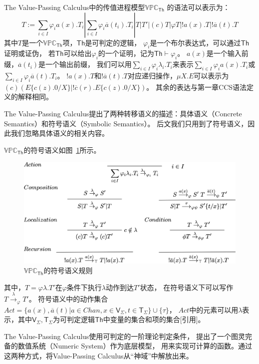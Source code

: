 The Value-Passing Calculus中的传值进程模型$\mathbb{VPC}_{\mathsf{Th}}$
的语法可以表示为：
$$T:=\sum_{i\in I}\varphi_i a(x).T_i|\sum_{i\in I}\varphi_i\overline{a}(t_i).T_i|T|T'|(c)T|\varphi T|!a(x).T|!\overline{a}(t).T$$
其中$T$是一个$\mathbb{VPC}_{\mathsf{Th}}$项，$\mathsf{Th}$是可判定的逻辑，
$\varphi_i$是一个布尔表达式，可以通过$\mathsf{Th}$证明或证伪，
若$\mathsf{Th}$可以给出$\varphi_i$的一个证明，记为$\mathsf{Th}\vdash \varphi_i$。
$a(x)$是一个输入前缀，$\overline{a}(t_i)$是一个输出前缀，
我们可以用$\sum_{i\in I}\varphi_i\lambda_i.T_i$来表示$\sum_{i\in I}\varphi_i a(x).T_i$或$\sum_{i\in I}\varphi_i \overline{a}(t).T_i$。
$!a(x).T$和$!\overline{a}(t).T$对应递归操作，$\mu X.E$可以表示为
$(c)(E\{c(z).0/X\}|!\overline{c}(r).E\{c(z).0/X\})$。
其余的表达与第一章CCS语法定义的解释相同。

The Value-Passing Calculus提出了两种转移语义的描述：具体语义（Concrete Semantics）和符号语义（Symbolic Semantics）。
后文我们只用到了符号语义，因此我们忽略具体语义的相关内容。

$\mathbb{VPC}_{\mathsf{Th}}$的符号语义如图~\ref{fig_vpc}所示。

\begin{figure}[!htbp]
   \small
   \centering
   \includegraphics[width=13cm]{../figure/vpc.png}
    \caption[]{$\mathbb{VPC}_{\mathsf{Th}}$的符号语义规则}
    \label{fig_vpc}
\end{figure}
其中，$T=\varphi \lambda.T'$在$\varphi$条件下执行$\lambda$动作到达$T'$状态，
在符号语义下可以写作$T\stackrel{\lambda}{\rightarrow}_{\varphi}T'$。
符号语义中的动作集合$Act=\{a(x),\overline{a}(t)| a\in Chan, x\in \mathsf{V}_{\Sigma}, t\in \mathsf{T}_{\Sigma}\}\cup \{\tau\}$，
$Act$中的元素可以用$\lambda$表示，其中$\mathsf{V}_{\Sigma},\mathsf{T}_{\Sigma}$为可判定逻辑$\mathsf{Th}$中变量的集合和项的集合[引用]。

The Value-Passing Calculus使用可判定的一阶理论判定条件，
提出了一个图灵完备的数值系统（Numeric System）作为底层模型，
用来实现可计算的函数。通过这两种方式，将Value-Passing Calculus从“神域”中解放出来。

